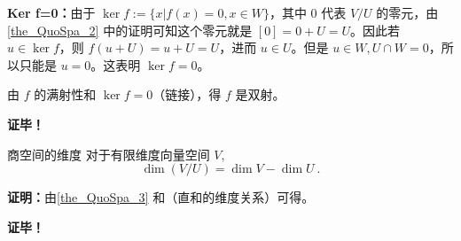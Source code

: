 \textbf{Ker f=0：}由于 $\ker f:=\{x|f(x)=0,x\in W\}$，其中 $0$ 代表 $V/U$ 的零元，由\autoref{the_QuoSpa_2} 中的证明可知这个零元就是 $[0]=0+U=U$。因此若 $u\in\ker f$，则 $f(u+U)=u+U=U$，进而 $u\in U$。但是 $u\in W,U\cap W=0$，所以只能是 $u=0$。这表明 $\ker f=0$。

由 $f$ 的满射性和 $\ker f=0$（链接），得 $f$ 是双射。

\textbf{证毕！}

\begin{corollary}{商空间的维度}
对于有限维度向量空间 $V$,
\begin{equation}
\dim(V/U) = \dim V - \dim U~.
\end{equation}
\end{corollary}

\textbf{证明：}由\autoref{the_QuoSpa_3} 和（直和的维度关系）可得。

\textbf{证毕！}










